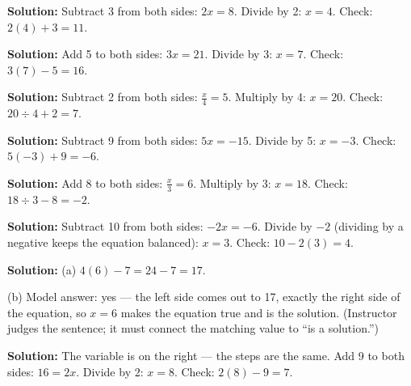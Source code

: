 \documentclass[12pt]{article}
\begin{document}



\textbf{Solution:} Subtract 3 from both sides: $2x = 8$. Divide by 2: $x = 4$.
Check: $2(4) + 3 = 11$. \checkmark {}


\textbf{Solution:} Add 5 to both sides: $3x = 21$. Divide by 3: $x = 7$.
Check: $3(7) - 5 = 16$. \checkmark {}


\textbf{Solution:} Subtract 2 from both sides: $\tfrac{x}{4} = 5$. Multiply by 4:
$x = 20$. Check: $20 \div 4 + 2 = 7$. \checkmark {}


\textbf{Solution:} Subtract 9 from both sides: $5x = -15$. Divide by 5: $x = -3$.
Check: $5(-3) + 9 = -6$. \checkmark {}


\textbf{Solution:} Add 8 to both sides: $\tfrac{x}{3} = 6$. Multiply by 3: $x = 18$.
Check: $18 \div 3 - 8 = -2$. \checkmark {}


\textbf{Solution:} Subtract 10 from both sides: $-2x = -6$. Divide by $-2$
(dividing by a negative keeps the equation balanced): $x = 3$.
Check: $10 - 2(3) = 4$. \checkmark {}


\textbf{Solution:} (a) $4(6) - 7 = 24 - 7 = 17$. 

(b) Model answer: yes --- the left side comes out to 17, exactly the right side of
the equation, so $x = 6$ makes the equation true and is the solution. (Instructor
judges the sentence; it must connect the matching value to ``is a solution.'')


\textbf{Solution:} The variable is on the right --- the steps are the same. Add 9 to
both sides: $16 = 2x$. Divide by 2: $x = 8$. Check: $2(8) - 9 = 7$. \checkmark {}
\end{document}
